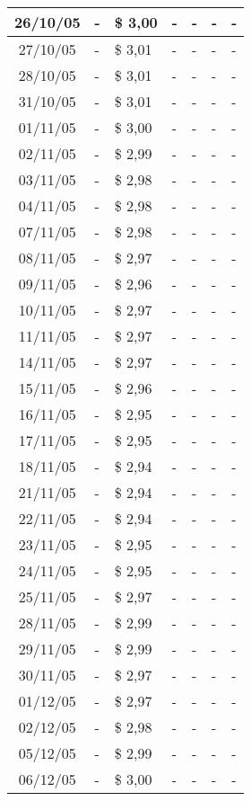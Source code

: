 \begin{center}
\begin{longtable}{|c|p{1.5cm}|p{1.5cm}|p{1.5cm}|p{1.5cm}|p{1.5cm}|p{1.5cm}|}
26/10/05 & - & \$ 3,00 & - & - & - & - \\ \hline
27/10/05 & - & \$ 3,01 & - & - & - & - \\ \hline
28/10/05 & - & \$ 3,01 & - & - & - & - \\ \hline
31/10/05 & - & \$ 3,01 & - & - & - & - \\ \hline
01/11/05 & - & \$ 3,00 & - & - & - & - \\ \hline
02/11/05 & - & \$ 2,99 & - & - & - & - \\ \hline
03/11/05 & - & \$ 2,98 & - & - & - & - \\ \hline
04/11/05 & - & \$ 2,98 & - & - & - & - \\ \hline
07/11/05 & - & \$ 2,98 & - & - & - & - \\ \hline
08/11/05 & - & \$ 2,97 & - & - & - & - \\ \hline
09/11/05 & - & \$ 2,96 & - & - & - & - \\ \hline
10/11/05 & - & \$ 2,97 & - & - & - & - \\ \hline
11/11/05 & - & \$ 2,97 & - & - & - & - \\ \hline
14/11/05 & - & \$ 2,97 & - & - & - & - \\ \hline
15/11/05 & - & \$ 2,96 & - & - & - & - \\ \hline
16/11/05 & - & \$ 2,95 & - & - & - & - \\ \hline
17/11/05 & - & \$ 2,95 & - & - & - & - \\ \hline
18/11/05 & - & \$ 2,94 & - & - & - & - \\ \hline
21/11/05 & - & \$ 2,94 & - & - & - & - \\ \hline
22/11/05 & - & \$ 2,94 & - & - & - & - \\ \hline
23/11/05 & - & \$ 2,95 & - & - & - & - \\ \hline
24/11/05 & - & \$ 2,95 & - & - & - & - \\ \hline
25/11/05 & - & \$ 2,97 & - & - & - & - \\ \hline
28/11/05 & - & \$ 2,99 & - & - & - & - \\ \hline
29/11/05 & - & \$ 2,99 & - & - & - & - \\ \hline
30/11/05 & - & \$ 2,97 & - & - & - & - \\ \hline
01/12/05 & - & \$ 2,97 & - & - & - & - \\ \hline
02/12/05 & - & \$ 2,98 & - & - & - & - \\ \hline
05/12/05 & - & \$ 2,99 & - & - & - & - \\ \hline
06/12/05 & - & \$ 3,00 & - & - & - & - \\ \hline

\end{longtable}
\end{center}
